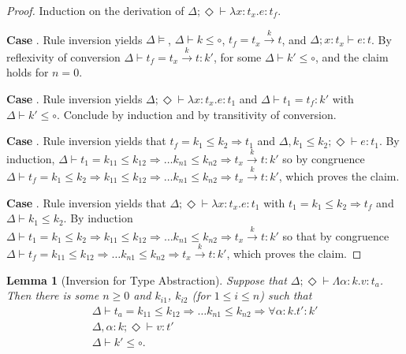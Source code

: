 \documentclass{article}
\newcommand{\ONE}{\circ}
\newcommand{\TASS}[1]{#1\colon\!}
\newcommand{\TVAR}{\alpha}
\newcommand{\TALL}[2]{\forall\TASS{#1}#2.}
\newcommand{\LAM}[2]{\lambda\TASS{#1}#2.}
\newcommand{\TLAM}[2]{\Lambda\TASS{#1}#2.}
\newcommand{\KENV}{\Delta}
\newcommand{\TENVEMPTY}{\Diamond}
\newtheorem{lemma}{Lemma}
\begin{document}
\begin{proof}
  Induction on the derivation of
  $\KENV; \TENVEMPTY \vdash \LAM x {t_x} e : t_f$.

  \textbf{Case} . Rule inversion yields $\KENV \models$,
  $\KENV \vdash k \le \ONE$, $t_f = t_x \stackrel{k}\to t$, and
  $\KENV; \TASS x{t_x} \vdash e : t$. By reflexivity of conversion
  $\KENV \vdash t_f = t_x \stackrel{k}\to t : k'$, for some
  $\KENV \vdash k' \le \ONE$, and the claim holds for $n=0$.

  \textbf{Case} . Rule inversion yields
  $\KENV; \TENVEMPTY \vdash \LAM x {t_x} e : t_1$ and
  $\KENV \vdash t_1 = t_f : k'$ with $\KENV \vdash k' \le
  \ONE$. Conclude by induction and by transitivity of conversion.

  \textbf{Case} . Rule inversion yields that
  $t_f = k_1 \le k_2 \Rightarrow t_1$ and
  $\KENV, k_1 \le k_2; \TENVEMPTY \vdash e : t_1$. By induction,
  $\KENV \vdash t_1 = k_{11}\le k_{12}\Rightarrow \dots k_{n1}\le
  k_{n2} \Rightarrow t_x \stackrel{k}\to t : k'$ so by congruence
  $\KENV \vdash t_f = k_1 \le k_2 \Rightarrow k_{11}\le k_{12}\Rightarrow \dots k_{n1}\le
  k_{n2} \Rightarrow t_x \stackrel{k}\to t : k'$, which proves the claim.

  \textbf{Case} . Rule inversion yields that
  $\KENV; \TENVEMPTY \vdash \LAM x {t_x} e : t_1$ with
  $t_1 = k_1 \le k_2 \Rightarrow t_f$ and $\KENV \vdash k_1 \le
  k_2$. By induction
  $\KENV \vdash t_1 = k_1 \le k_2 \Rightarrow k_{11}\le
  k_{12}\Rightarrow \dots k_{n1}\le k_{n2} \Rightarrow t_x
  \stackrel{k}\to t : k'$ so that by congruence
  $\KENV \vdash t_f = k_{11}\le
  k_{12}\Rightarrow \dots k_{n1}\le k_{n2} \Rightarrow t_x
  \stackrel{k}\to t : k'$, which proves the claim.
\end{proof}
\begin{lemma}[Inversion for Type Abstraction]\label{lemma:inversion-universal}
  Suppose that $\KENV; \TENVEMPTY \vdash \TLAM\TVAR k v : t_a$.
  Then there is some $n\ge0$ and $k_{i1}$, $k_{i2}$ (for $1\le i\le n$) such that 
  \begin{gather}
    \KENV \vdash t_a = k_{11}\le k_{12}\Rightarrow \dots k_{n1}\le k_{n2} \Rightarrow \TALL \TVAR k t' : k'
    \\
    \KENV, \TASS \TVAR{k}; \TENVEMPTY \vdash v : t'
    \\
    \KENV \vdash k' \le \ONE
    \mathrm{.}
  \end{gather}
\end{lemma}
\end{document}
